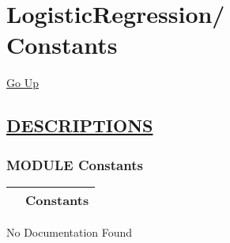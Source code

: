 \chapter*{\color{headfile}
{\large LogisticRegression\slash\hspace{0pt}}
 \\
Constants
}
\hypertarget{ecldoc:toc:LogisticRegression.Constants}{}
\hyperlink{ecldoc:toc:root/LogisticRegression}{Go Up}


\section*{\underline{\textsf{DESCRIPTIONS}}}
\subsection*{\textsf{\colorbox{headtoc}{\color{white} MODULE}
Constants}}

\hypertarget{ecldoc:LogisticRegression.Constants}{}

{\renewcommand{\arraystretch}{1.5}
\begin{tabularx}{\textwidth}{|>{\raggedright\arraybackslash}l|X|}
\hline
\hspace{0pt}\mytexttt{\color{red} } & \textbf{Constants} \\
\hline
\end{tabularx}
}

\par





No Documentation Found







